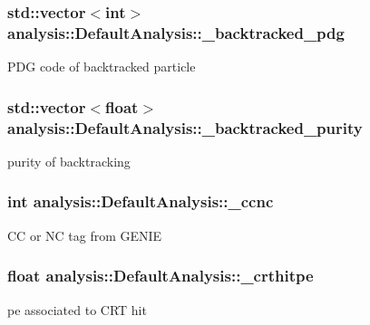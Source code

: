 \subsubsection[{\texorpdfstring{\+\_\+backtracked\+\_\+pdg}{_backtracked_pdg}}]{\setlength{\rightskip}{0pt plus 5cm}std\+::vector$<$int$>$ analysis\+::\+Default\+Analysis\+::\+\_\+backtracked\+\_\+pdg\hspace{0.3cm}{\ttfamily [private]}}\hypertarget{classanalysis_1_1DefaultAnalysis_a28bd59dce75b8fd3be70bd4996354ae9}{}\label{classanalysis_1_1DefaultAnalysis_a28bd59dce75b8fd3be70bd4996354ae9}
P\+DG code of backtracked particle 
\subsubsection[{\texorpdfstring{\+\_\+backtracked\+\_\+purity}{_backtracked_purity}}]{\setlength{\rightskip}{0pt plus 5cm}std\+::vector$<$float$>$ analysis\+::\+Default\+Analysis\+::\+\_\+backtracked\+\_\+purity\hspace{0.3cm}{\ttfamily [private]}}\hypertarget{classanalysis_1_1DefaultAnalysis_ad08d9b30c434685e350c5f292d4df08b}{}\label{classanalysis_1_1DefaultAnalysis_ad08d9b30c434685e350c5f292d4df08b}
purity of backtracking 
\subsubsection[{\texorpdfstring{\+\_\+ccnc}{_ccnc}}]{\setlength{\rightskip}{0pt plus 5cm}int analysis\+::\+Default\+Analysis\+::\+\_\+ccnc\hspace{0.3cm}{\ttfamily [private]}}\hypertarget{classanalysis_1_1DefaultAnalysis_ac2df5c78c8d06e090d0b6cd195fa83d8}{}\label{classanalysis_1_1DefaultAnalysis_ac2df5c78c8d06e090d0b6cd195fa83d8}
CC or NC tag from G\+E\+N\+IE 
\subsubsection[{\texorpdfstring{\+\_\+crthitpe}{_crthitpe}}]{\setlength{\rightskip}{0pt plus 5cm}float analysis\+::\+Default\+Analysis\+::\+\_\+crthitpe\hspace{0.3cm}{\ttfamily [private]}}\hypertarget{classanalysis_1_1DefaultAnalysis_a900ec35e3ca4a00d4625a1e632bb6b40}{}\label{classanalysis_1_1DefaultAnalysis_a900ec35e3ca4a00d4625a1e632bb6b40}
pe associated to C\+RT hit 
